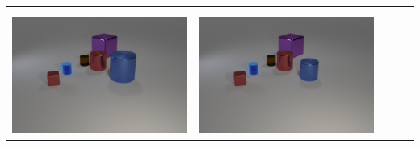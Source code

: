 \begin{table}
\begin{tabular}{@{}ccccc@{}}
\begin{minipage}{.2\textwidth}
    \end{minipage}
\\ \\
    \begin{minipage}{.2\textwidth}
      \includegraphics[width=\linewidth]{figures/clevr_datasets/CLEVRA_examples/train5.png}
    \end{minipage}
    &
    \begin{minipage}{.2\textwidth}
      \includegraphics[width=\linewidth]{figures/clevr_datasets/CLEVRA_examples/train_size5.png}
    \end{minipage}
    &&
    \begin{minipage}{.2\textwidth}

\end{minipage}
\end{tabular}
\end{table}
